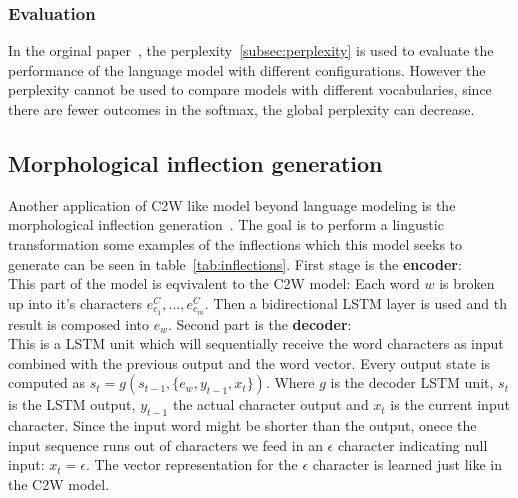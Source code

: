 \subsubsection{Evaluation}

In the orginal paper~\cite{DBLP:journals/corr/LingLMAADBT15}, the perplexity~\ref{subsec:perplexity} is 
used to evaluate the performance of the language model with different configurations. 
However the perplexity cannot be used to compare models with different vocabularies,
since there are fewer outcomes in the softmax, the global perplexity can decrease.



\subsection{Morphological inflection generation}

Another application of C2W like model beyond language modeling is the morphological inflection generation~\cite{DBLP:journals/corr/FaruquiTND15}.
The goal is to perform a lingustic transformation some examples of the inflections which this model seeks to generate can be seen in table~\ref{tab:inflections}.
First stage is the \textbf{encoder}:\\
This part of the model is eqvivalent to the C2W model: Each word $w$ is broken up into it's characters $e_{c_1}^C, \dots, e_{c_m}^C$.
Then a bidirectional LSTM layer is used and th result is composed into $e_{w}$.
Second part is the \textbf{decoder}:\\
This is a LSTM unit which will sequentially receive the word characters as input combined with the previous output and the word vector.
Every output state is computed as $s_t = g(s_{t-1}, \{e_{w}, y_{t-1}, x_t\})$. Where $g$ is the decoder LSTM unit,
$s_t$ is the LSTM output, $y_{t-1}$ the actual character output and $x_t$ is the current input character.
Since the input word might be shorter than the output, onece the input sequence runs out of characters we feed in an $\epsilon$ character
indicating null input: $x_t = \epsilon$. The vector representation for the $\epsilon$ character is learned just like in the C2W model.


